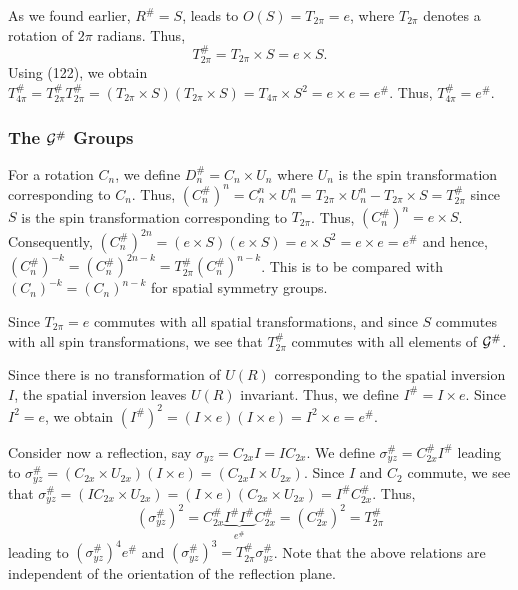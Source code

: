 As we found earlier, $R^{\#} = S$, leads to $O(S) = T_{2\pi} = e$, 
where $T_{2\pi}$ denotes a rotation of $2\pi$ radians. Thus,
\begin{equation}
T^{\#}_{2\pi} = T_{2\pi} \times S = e \times S.
\label{chap16-eqno122}
\end{equation}
Using (122), we obtain $T^{\#}_{4\pi} = T^{\#}_{2\pi} 
T^{\#}_{2\pi} = (T_{2\pi} \times S)(T_{2\pi} \times S) = T_{4\pi} 
\times S^2 = e \times e = e^{\#}$.  Thus, $T^{\#}_{4\pi} = e^{\#}$.

\subsubsection{The ${\cal G}^{\#}$ Groups}

For a rotation $C_n$, we define $D^{\#}_n = C_n \times U_n$ where 
$U_n$ is the spin transformation corresponding to $C_n$.  Thus, 
$(C^{\#}_n)^n = C^n_n \times U^n_n = T_{2\pi} \times U^n_n - 
T_{2\pi} \times S = T^{\#}_{2\pi}$ since $S$ is the spin 
transformation corresponding to $T_{2\pi}$.  Thus, $(C^{\#}_n)^n = e 
\times S$.  Consequently, $(C^{\#}_n)^{2n} = (e \times S)(e \times 
S) = e \times S^2 = e \times e = e^{\#}$ and hence, 
$(C^{\#}_n)^{-k} = (C_n^{\#})^{2n-k} = 
T^{\#}_{2\pi} (C^{\#}_n)^{n-k}$.  This is to be compared with  
$(C_n)^{-k}=(C_n)^{n-k}$ for spatial symmetry groups.

Since $T_{2\pi} = e$ commutes with all spatial transformations, and 
since $S$ commutes with all spin transformations, we see that 
$T^{\#}_{2\pi}$ commutes with all elements of ${\cal G}^{\#}$.

Since there is no transformation of $U(R)$ corresponding to the 
spatial inversion $I$, the spatial inversion leaves $U(R)$ 
invariant.  Thus, we define $I^{\#} = I \times e$.  Since $I^2 = e$, 
we obtain $(I^{\#})^2 = (I \times e)(I \times e) = I^2 \times e = 
e^{\#}$.  

Consider now a reflection, say $\sigma_{yz} = C_{2x}I = IC_{2x}$.  We 
define $\sigma^{\#}_{yz} = C^{\#}_{2x}I^{\#}$ leading to 
$\sigma^{\#}_{yz} =(C_{2x} \times U_{2x})(I \times e) = (C_{2x}I 
\times U_{2x})$.  Since $I$ and $C_2$ commute, we see that 
$\sigma^{\#}_{yz} = (IC_{2x} \times U_{2x}) = (I \times e)(C_{2x} 
\times U_{2x}) = I^{\#}C^{\#}_{2x}$.  Thus, 
\begin{equation}
\left( \sigma^{\#}_{yz} \right)^2 = C^{\#}_{2x} 
\underbrace{I^{\#}I^{\#}}_{e^{\#}} C^{\#}_{2x} = \left( C^{\#}_{2x} 
\right)^2 = T^{\#}_{2\pi}
\end{equation}
leading to $(\sigma^{\#}_{yz})^4  e^{\#}$ and $ 
(\sigma^{\#}_{yz})^3 = T^{\#}_{2\pi} \sigma^{\#}_{yz}$.  Note that the 
above relations are independent of the orientation of the reflection 
plane.

